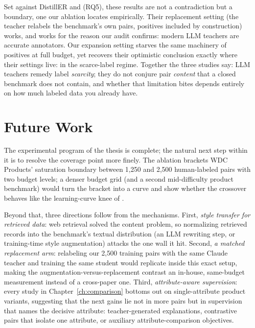 \documentclass[a4paper,oneside,bibliography=totoc]{scrbook}
\begin{document}
Set against DistillER and \citet{steiner2026labeling} (RQ5), these results are not a contradiction but a boundary, one our ablation locates empirically. Their replacement setting (the teacher relabels the benchmark's own pairs, positives included by construction) works, and works for the reason our audit confirms: modern LLM teachers are accurate annotators. Our expansion setting starves the same machinery of positives at full budget, yet recovers their optimistic conclusion exactly where their settings live: in the scarce-label regime. Together the three studies say: LLM teachers remedy label \emph{scarcity}; they do not conjure pair \emph{content} that a closed benchmark does not contain, and whether that limitation bites depends entirely on how much labeled data you already have.

\section{Future Work}
\label{sec:future}

The experimental program of the thesis is complete; the natural next step within it is to resolve the coverage point more finely. The ablation brackets WDC Products' saturation boundary between 1{,}250 and 2{,}500 human-labeled pairs with two budget levels; a denser budget grid (and a second mid-difficulty product benchmark) would turn the bracket into a curve and show whether the crossover behaves like the learning-curve knee of \citet{steiner2026labeling}.

Beyond that, three directions follow from the mechanisms. First, \emph{style transfer for retrieved data}: web retrieval solved the content problem, so normalizing retrieved records into the benchmark's textual distribution (an LLM rewriting step, or training-time style augmentation) attacks the one wall it hit. Second, \emph{a matched replacement arm}: relabeling our 2{,}500 training pairs with the same Claude teacher and training the same student would replicate \citet{steiner2026labeling} inside this exact setup, making the augmentation-versus-replacement contrast an in-house, same-budget measurement instead of a cross-paper one. Third, \emph{attribute-aware supervision}: every study in Chapter~\ref{ch:comparison} bottoms out on single-attribute product variants, suggesting that the next gains lie not in more pairs but in supervision that names the decisive attribute: teacher-generated explanations, contrastive pairs that isolate one attribute, or auxiliary attribute-comparison objectives.
\end{document}
